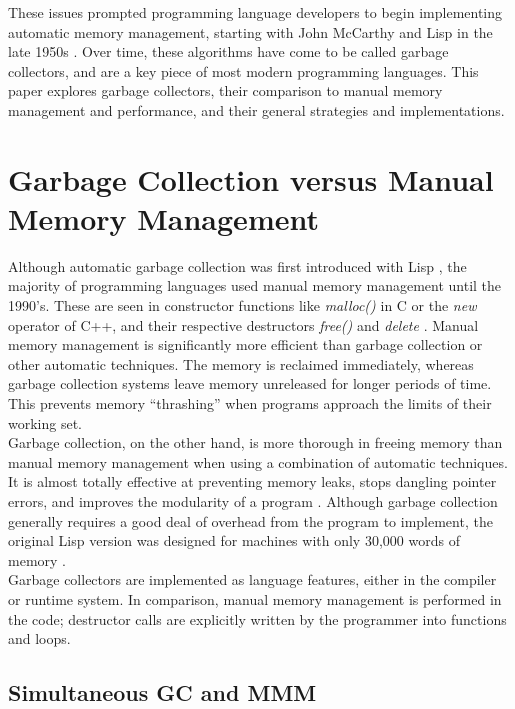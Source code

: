 \documentclass[12pt]{article}
\begin{document}
These issues prompted programming language developers to begin implementing automatic memory management, starting with John McCarthy and Lisp in the late 1950s \cite{https://www.seas.harvard.edu/courses/cs252/2016fa/16.pdf}. Over time, these algorithms have come to be called garbage collectors, and are a key piece of most modern programming languages. This paper explores garbage collectors, their comparison to manual memory management and performance, and their general strategies and implementations. 

\section{Garbage Collection versus Manual Memory Management}
Although automatic garbage collection was first introduced with Lisp \cite{chis11}, the majority of programming languages used manual memory management until the 1990's. These are seen in constructor functions like \textit{malloc()} in C or the \textit{new} operator of C++, and their respective destructors \textit{free()} and \textit{delete} \cite{pythDocs}. Manual memory management is significantly more efficient than garbage collection or other automatic techniques. The memory is reclaimed immediately, whereas garbage collection systems leave memory unreleased for longer periods of time. This prevents memory ``thrashing'' when programs approach the limits of their working set.\\

Garbage collection, on the other hand, is more thorough in freeing memory than manual memory management when using a combination of automatic techniques. It is almost totally effective at preventing memory leaks, stops dangling pointer errors, and improves the modularity of a program \cite{hertz05}. Although garbage collection generally requires a good deal of overhead from the program to implement, the original Lisp version was designed for machines with only 30,000 words of memory \cite{chis11}.\\

Garbage collectors are implemented as language features, either in the compiler or runtime system. In comparison, manual memory management is performed in the code; destructor calls are explicitly written by the programmer into functions and loops.
\subsection{Simultaneous GC and MMM}
\end{document}
